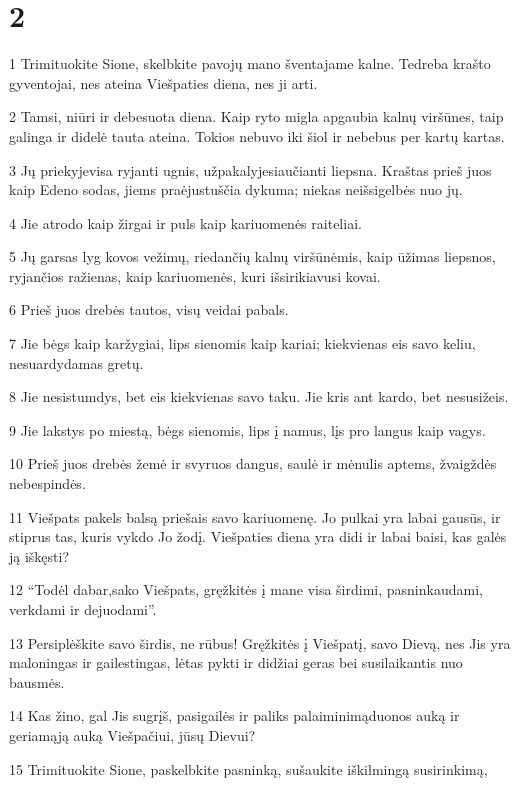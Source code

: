 \chapter{2}


\par 1 Trimituokite Sione, skelbkite pavojų mano šventajame kalne. Tedreba krašto gyventojai, nes ateina Viešpaties diena, nes ji arti. 
\par 2 Tamsi, niūri ir debesuota diena. Kaip ryto migla apgaubia kalnų viršūnes, taip galinga ir didelė tauta ateina. Tokios nebuvo iki šiol ir nebebus per kartų kartas. 
\par 3 Jų priekyje­visa ryjanti ugnis, užpakalyje­siaučianti liepsna. Kraštas prieš juos kaip Edeno sodas, jiems praėjus­tuščia dykuma; niekas neišsigelbės nuo jų. 
\par 4 Jie atrodo kaip žirgai ir puls kaip kariuomenės raiteliai. 
\par 5 Jų garsas lyg kovos vežimų, riedančių kalnų viršūnėmis, kaip ūžimas liepsnos, ryjančios ražienas, kaip kariuomenės, kuri išsirikiavusi kovai. 
\par 6 Prieš juos drebės tautos, visų veidai pabals. 
\par 7 Jie bėgs kaip karžygiai, lips sienomis kaip kariai; kiekvienas eis savo keliu, nesuardydamas gretų. 
\par 8 Jie nesistumdys, bet eis kiekvienas savo taku. Jie kris ant kardo, bet nesusižeis. 
\par 9 Jie lakstys po miestą, bėgs sienomis, lips į namus, lįs pro langus kaip vagys. 
\par 10 Prieš juos drebės žemė ir svyruos dangus, saulė ir mėnulis aptems, žvaigždės nebespindės. 
\par 11 Viešpats pakels balsą priešais savo kariuomenę. Jo pulkai yra labai gausūs, ir stiprus tas, kuris vykdo Jo žodį. Viešpaties diena yra didi ir labai baisi, kas galės ją iškęsti? 
\par 12 “Todėl dabar,­sako Viešpats,­ gręžkitės į mane visa širdimi, pasninkaudami, verkdami ir dejuodami”. 
\par 13 Persiplėškite savo širdis, ne rūbus! Gręžkitės į Viešpatį, savo Dievą, nes Jis yra maloningas ir gailestingas, lėtas pykti ir didžiai geras bei susilaikantis nuo bausmės. 
\par 14 Kas žino, gal Jis sugrįš, pasigailės ir paliks palaiminimą­duonos auką ir geriamąją auką Viešpačiui, jūsų Dievui? 
\par 15 Trimituokite Sione, paskelbkite pasninką, sušaukite iškilmingą susirinkimą, 
